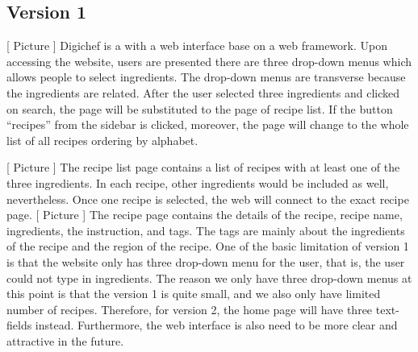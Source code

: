 \documentclass[12pt]{article}
\begin{document}
\subsection{Version 1}

[ Picture ]
Digichef is a with a web interface base on a web framework. Upon accessing the website, users are presented there are three drop-down menus which allows people to select ingredients. The drop-down menus are transverse because the ingredients are related. After the user selected three ingredients and clicked on search, the page will be substituted to the page of recipe list. If the button “recipes” from the sidebar is clicked, moreover, the page will change to the whole list of all recipes ordering by alphabet.

[ Picture ]
The recipe list page contains a list of recipes with at least one of the three ingredients. In each recipe, other ingredients would be included as well, nevertheless. Once one recipe is selected, the web will connect to the exact recipe page.
[ Picture ]
The recipe page contains the details of the recipe, recipe name, ingredients, the instruction, and tags. The tags are mainly about the ingredients of the recipe and the region of the recipe.
One of the basic limitation of version 1 is that the website only has three drop-down menu for the user, that is, the user could not type in ingredients. The reason we only have three drop-down menus at this point is that the version 1 is quite small, and we also only have limited number of recipes. Therefore, for version 2, the home page will have three text-fields instead. Furthermore, the web interface is also need to be more clear and attractive in the future.
\end{document}
